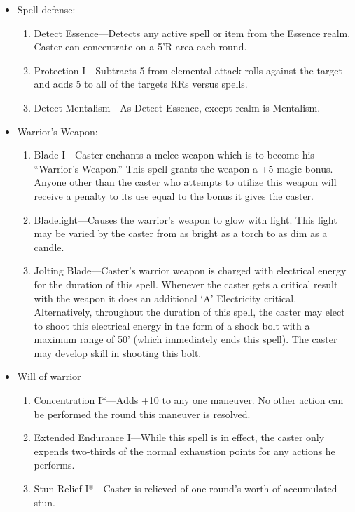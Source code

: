 \documentclass[oneside,12pt]{book}
\begin{document}
\begin{flushleft}
\begin{description}
{\begin{itemize}
\begin{enumerate}
\scriptsize
\item Snap Attack*—This spell allows the caster to make a
special attack that uses only 60\% of the character’s
activity, but with the character’s full OB.
\item Split Parry II*—Caster may divide his parry between
up to two melee attackers with no penalty.
\item Moving Strike I*—Caster may move up to 30\%
normal movement and attack without suffering a
penalty to his OB.
\end{enumerate}
\item Spell defense:
\begin{enumerate}
\scriptsize
\item Detect Essence—Detects any active spell or item from
the Essence realm. Caster can concentrate on a 5’R
area each round.
\item Protection I—Subtracts 5 from elemental attack rolls
against the target and adds 5 to all of the targets RRs
versus spells.
\item Detect Mentalism—As Detect Essence, except realm is
Mentalism.\end{enumerate}
\item Warrior's Weapon:
\begin{enumerate}
\scriptsize
\item Blade I—Caster enchants a melee weapon which is to
become his “Warrior’s Weapon.” This spell grants the
weapon a +5 magic bonus. Anyone other than the
caster who attempts to utilize this weapon will receive a
penalty to its use equal to the bonus it gives the caster.
\item Bladelight—Causes the warrior’s weapon to glow with
light. This light may be varied by the caster from as
bright as a torch to as dim as a candle.
\item Jolting Blade—Caster’s warrior weapon is charged with
electrical energy for the duration of this spell. Whenever
the caster gets a critical result with the weapon it does an
additional ‘A’ Electricity critical. Alternatively, throughout
the duration of this spell, the caster may elect to shoot
this electrical energy in the form of a shock bolt with a
maximum range of 50' (which immediately ends this
spell). The caster may develop skill in shooting this bolt.
\end{enumerate}
\item Will of warrior
\begin{enumerate}
\scriptsize
\item Concentration I*—Adds +10 to any one maneuver. No
other action can be performed the round this
maneuver is resolved.
\item Extended Endurance I—While this spell is in effect, the
caster only expends two-thirds of the normal
exhaustion points for any actions he performs.
\item Stun Relief I*—Caster is relieved of one round’s worth
of accumulated stun.\end{enumerate}
\end{itemize}
}
\end{description}
\clearpage

\end{flushleft}
\end{document}
